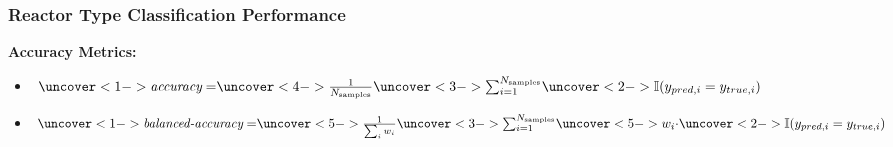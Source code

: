 \begin{frame}
  \frametitle{Reactor Type Classification Performance}
  \textbf{Accuracy Metrics:} \cite{scikit}
  \vspace{2mm}
  \begin{itemize}\addtolength{\itemsep}{0.4\baselineskip}
    \item $\uncover<1->{\textit{accuracy} = }
           \uncover<4->{\frac{1}{N_\text{samples}}}
           \uncover<3->{\sum_{i=1}^{N_\text{samples}}}
           \uncover<2->{\mathbb{I}(y_{pred,i} = y_{true,i})}$
    \item $\uncover<1->{\textit{balanced-accuracy} = }
           \uncover<5->{\frac{1}{\sum_{i}{w_i}}}
           \uncover<3->{\sum_{i=1}^{N_\text{samples}}}
           \uncover<5->{w_i \cdot}
           \uncover<2->{\mathbb{I}(y_{pred, i} = y_{true, i})}$ \\
            
            
  \end{itemize}
\end{frame}
